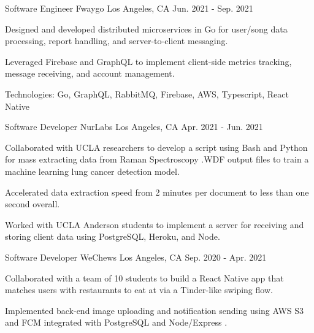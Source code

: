 

\begin{cventries}

\cventry
    {Software Engineer} %
    {Fwaygo} %
    {Los Angeles, CA} %
    {Jun. 2021 - Sep. 2021} %
    {
      \begin{cvitems} %
        \item {Designed and developed distributed microservices in Go for
        user/song data processing, report handling, and server-to-client
        messaging.}
        \item {Leveraged Firebase and GraphQL to implement client-side metrics
        tracking, message receiving, and account management.}
        \item {Technologies: Go, GraphQL, RabbitMQ, Firebase, AWS, Typescript,
        React Native}
      \end{cvitems}
    }

\cventry
    {Software Developer} %
    {NurLabs} %
    {Los Angeles, CA} %
    {Apr. 2021 - Jun. 2021} %
    {
      \begin{cvitems} %
        \item {Collaborated with UCLA researchers to develop a script using Bash
        and Python for mass extracting data from Raman Spectroscopy .WDF output
        files to train a machine learning lung cancer detection model.}
        \item {Accelerated data extraction speed from 2 minutes per document to
        less than one second overall.}
        \item {Worked with UCLA Anderson students to implement a server for
        receiving and storing client data using PostgreSQL, Heroku, and Node.}
      \end{cvitems}
    }

\cventry
    {Software Developer} %
    {WeChews} %
    {Los Angeles, CA} %
    {Sep. 2020 - Apr. 2021} %
    {
      \begin{cvitems} %
        \item {Collaborated with a team of 10 students to build a React Native
        app that matches users with restaurants to eat at via a Tinder-like
        swiping flow.}
        \item {Implemented back-end image uploading and notification sending
        using AWS S3 and FCM integrated with PostgreSQL and Node/Express .}
      \end{cvitems}
    }
\end{cventries}
